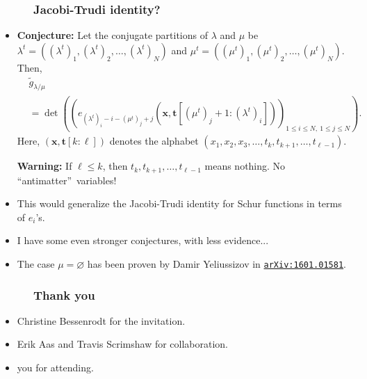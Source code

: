 \documentclass{beamer}
\newcommand{\red}{\color{red}}
\newcommand\arxiv[1]{\href{http://www.arxiv.org/abs/#1}{\texttt{arXiv:#1}}}
\newcommand{\fti}[1]{\frametitle{\ \ \ \ \ #1}}
\theoremstyle{plain}
\newcommand{\0}{\phantom{c}}
\begin{document}
\begin{frame}
\fti{Jacobi-Trudi identity?}

\begin{itemize}

\item \textbf{Conjecture:}
Let the conjugate partitions of $\lambda$ and
$\mu$ be $\lambda^{t}=\left(  \left(  \lambda^{t}\right)  _{1},\left(
\lambda^{t}\right)  _{2},\ldots,\left(  \lambda^{t}\right)  _{N}\right)  $ and
$\mu^{t}=\left(  \left(  \mu^{t}\right)  _{1},\left(  \mu^{t}\right)
_{2},\ldots,\left(  \mu^{t}\right)  _{N}\right)  $. Then,%
\begin{align*}
&  \widetilde{g}_{\lambda/\mu}\\
&  =\det\left(  \left(  e_{\left(  \lambda^{t}\right)  _{i}-i-\left(  \mu
^{t}\right)  _{j}+j}\left(  \mathbf{x},\mathbf{t}\left[  \left(  \mu
^{t}\right)  _{j}+1:\left(  \lambda^{t}\right)  _{i}\right]  \right)  \right)
_{1\leq i\leq N,\ 1\leq j\leq N}\right)  .
\end{align*}
Here, $\left(  \mathbf{x},\mathbf{t}\left[  k:\ell\right]  \right)  $ denotes
the alphabet $\left(  x_{1},x_{2},x_{3},\ldots,t_{k},t_{k+1},\ldots,t_{\ell
-1}\right)  $.

\textbf{Warning:} If $\ell\leq k$, then $t_{k},t_{k+1},\ldots,t_{\ell-1}$
means nothing. No \textquotedblleft antimatter\textquotedblright\ variables!

\pause
\item This would generalize the Jacobi-Trudi identity for Schur
      functions in terms of $e_i$'s.

\pause
\item I have some even stronger conjectures, with less evidence...

\pause
\item The case $\mu = \varnothing$ has been proven by Damir Yeliussizov
      in {\red \arxiv{1601.01581}}.

\end{itemize}

\end{frame}

\begin{frame}
\fti{Thank you}

\begin{itemize}

\item Christine Bessenrodt for the invitation.

\item Erik Aas and Travis Scrimshaw for collaboration.

\item you for attending.

\end{itemize}

\end{frame}
\end{document}
